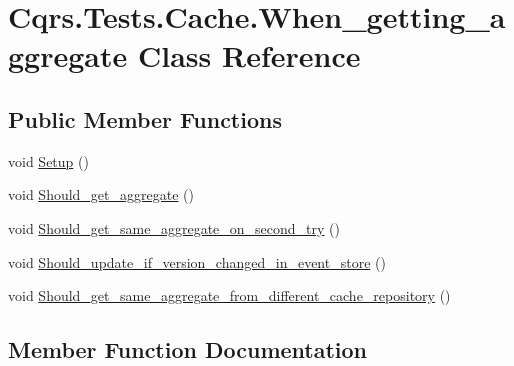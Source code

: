 \hypertarget{classCqrs_1_1Tests_1_1Cache_1_1When__getting__aggregate}{}\section{Cqrs.\+Tests.\+Cache.\+When\+\_\+getting\+\_\+aggregate Class Reference}
\label{classCqrs_1_1Tests_1_1Cache_1_1When__getting__aggregate}
\subsection*{Public Member Functions}
\begin{DoxyCompactItemize}
\item 
void \hyperlink{classCqrs_1_1Tests_1_1Cache_1_1When__getting__aggregate_aef82609ec76cb2b4667fdf62a758ec01}{Setup} ()
\item 
void \hyperlink{classCqrs_1_1Tests_1_1Cache_1_1When__getting__aggregate_a1db447f694f8a5b8bce71fc7b7c88c92}{Should\+\_\+get\+\_\+aggregate} ()
\item 
void \hyperlink{classCqrs_1_1Tests_1_1Cache_1_1When__getting__aggregate_a329285a9dec3474e2cd190f502af1693}{Should\+\_\+get\+\_\+same\+\_\+aggregate\+\_\+on\+\_\+second\+\_\+try} ()
\item 
void \hyperlink{classCqrs_1_1Tests_1_1Cache_1_1When__getting__aggregate_a3612bd05c3365fcdbcaaf190c4f0b8f2}{Should\+\_\+update\+\_\+if\+\_\+version\+\_\+changed\+\_\+in\+\_\+event\+\_\+store} ()
\item 
void \hyperlink{classCqrs_1_1Tests_1_1Cache_1_1When__getting__aggregate_a013bd4cd68068c1457ce1b463b30fb09}{Should\+\_\+get\+\_\+same\+\_\+aggregate\+\_\+from\+\_\+different\+\_\+cache\+\_\+repository} ()
\end{DoxyCompactItemize}


\subsection{Member Function Documentation}
\mbox{\label{classCqrs_1_1Tests_1_1Cache_1_1When__getting__aggregate_aef82609ec76cb2b4667fdf62a758ec01}} 
